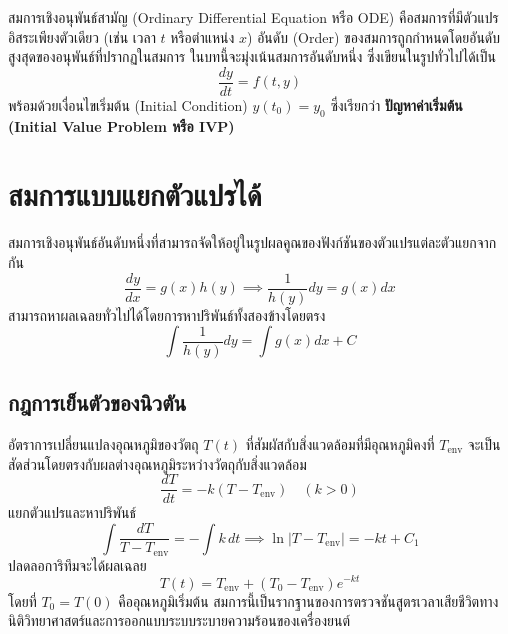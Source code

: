 สมการเชิงอนุพันธ์สามัญ (Ordinary Differential Equation หรือ ODE) คือสมการที่มีตัวแปรอิสระเพียงตัวเดียว (เช่น เวลา $t$ หรือตำแหน่ง $x$) อันดับ (Order) ของสมการถูกกำหนดโดยอันดับสูงสุดของอนุพันธ์ที่ปรากฏในสมการ ในบทนี้จะมุ่งเน้นสมการอันดับหนึ่ง ซึ่งเขียนในรูปทั่วไปได้เป็น
\begin{equation}
\frac{dy}{dt} = f(t, y)
\end{equation}
พร้อมด้วยเงื่อนไขเริ่มต้น (Initial Condition) $y(t_0) = y_0$ ซึ่งเรียกว่า \textbf{ปัญหาค่าเริ่มต้น (Initial Value Problem หรือ IVP)}

\section{สมการแบบแยกตัวแปรได้}
สมการเชิงอนุพันธ์อันดับหนึ่งที่สามารถจัดให้อยู่ในรูปผลคูณของฟังก์ชันของตัวแปรแต่ละตัวแยกจากกัน
\begin{equation}
\frac{dy}{dx} = g(x)h(y) \implies \frac{1}{h(y)}dy = g(x)dx
\end{equation}
สามารถหาผลเฉลยทั่วไปได้โดยการหาปริพันธ์ทั้งสองข้างโดยตรง
\begin{equation}
\int \frac{1}{h(y)}dy = \int g(x)dx + C
\end{equation}

\subsection{กฎการเย็นตัวของนิวตัน}
อัตราการเปลี่ยนแปลงอุณหภูมิของวัตถุ $T(t)$ ที่สัมผัสกับสิ่งแวดล้อมที่มีอุณหภูมิคงที่ $T_{\text{env}}$ จะเป็นสัดส่วนโดยตรงกับผลต่างอุณหภูมิระหว่างวัตถุกับสิ่งแวดล้อม
\begin{equation}
\frac{dT}{dt} = -k(T - T_{\text{env}}) \quad (k > 0)
\end{equation}
แยกตัวแปรและหาปริพันธ์
\begin{equation}
\int \frac{dT}{T - T_{\text{env}}} = -\int k \, dt \implies \ln|T - T_{\text{env}}| = -kt + C_1
\end{equation}
ปลดลอการิทึมจะได้ผลเฉลย
\begin{equation}
T(t) = T_{\text{env}} + (T_0 - T_{\text{env}})e^{-kt}
\end{equation}
โดยที่ $T_0 = T(0)$ คืออุณหภูมิเริ่มต้น สมการนี้เป็นรากฐานของการตรวจชันสูตรเวลาเสียชีวิตทางนิติวิทยาศาสตร์และการออกแบบระบบระบายความร้อนของเครื่องยนต์

